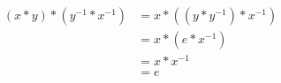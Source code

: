 \begin{align*}
  (x * y) * (y^{-1} * x^{-1})
  &= x * ((y * y^{-1}) * x^{-1}) \\
  &= x * (e * x^{-1}) \\
  &= x * x^{-1} \\
  &= e
\end{align*}

